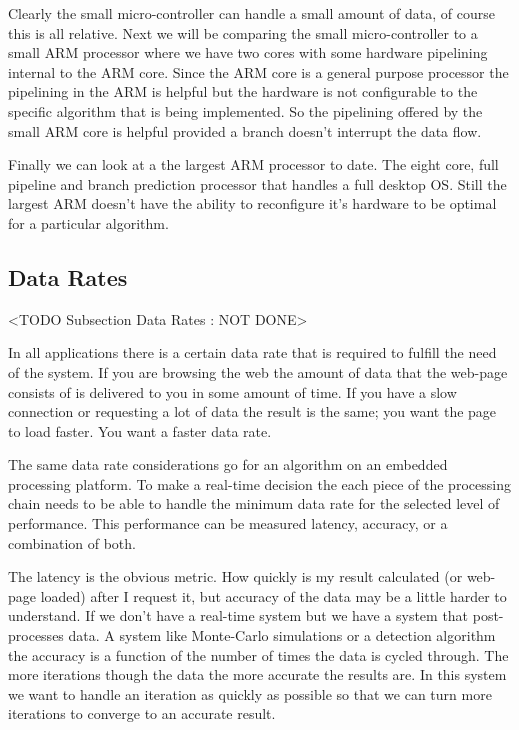 Clearly the small micro-controller can handle a small amount of data, of course this is all relative. Next we will be comparing the small micro-controller to a small \ac{ARM} processor where we have two cores with some hardware pipelining internal to the \ac{ARM} core. Since the \ac{ARM} core is a general purpose processor the pipelining in the \ac{ARM} is helpful but the hardware is not configurable to the specific algorithm that is being implemented. So the pipelining offered by the small \ac{ARM} core is helpful provided a branch doesn't interrupt the data flow. 

Finally we can look at a the largest \ac{ARM} processor to date. The eight core, full pipeline and branch prediction processor that handles a full desktop \ac{OS}. Still the largest \ac{ARM} doesn't have the ability to reconfigure it's hardware to be optimal for a particular algorithm.

\subsection{Data Rates}
	<TODO Subsection Data Rates : NOT DONE>
	
In all applications there is a certain data rate that is required to fulfill the need of the system. If you are browsing the web the amount of data that the web-page consists of is delivered to you in some amount of time. If you have a slow connection or requesting a lot of data the result is the same; you want the page to load faster. You want a faster data rate.

The same data rate considerations go for an algorithm on an embedded processing platform. To make a real-time decision the each piece of the processing chain needs to be able to handle the minimum data rate for the selected level of performance. This performance can be measured latency, accuracy, or a combination of both. 

The latency is the obvious metric. How quickly is my result calculated (or web-page loaded) after I request it, but accuracy of the data may be a little harder to understand. If we don't have a real-time system but we have a system that post-processes data. A system like Monte-Carlo simulations or a detection algorithm the accuracy is a function of the number of times the data is cycled through. The more iterations though the data the more accurate the results are. In this system we want to handle an iteration as quickly as possible so that we can turn more iterations to converge to an accurate result. 
	
